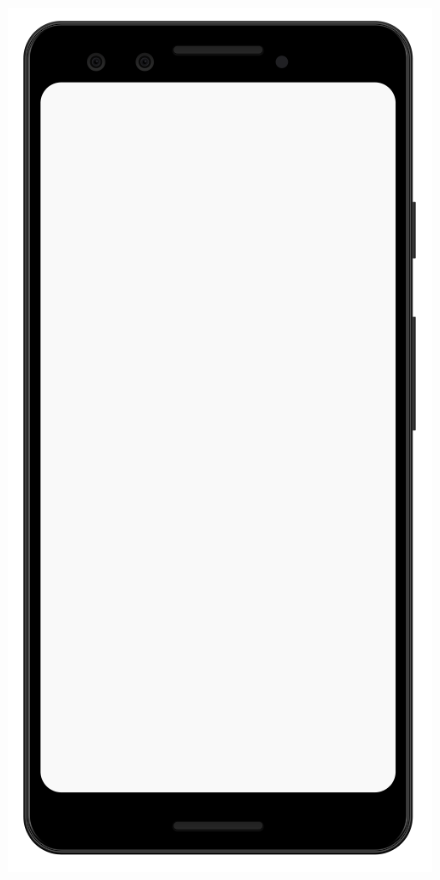 \documentclass[12pt,a4paper,twoside,openright,titlepage]{book}
\begin{document}
\begin{figure}[H]
\includegraphics[scale = 0.2]{mobile}

\end{figure}
\end{document}
